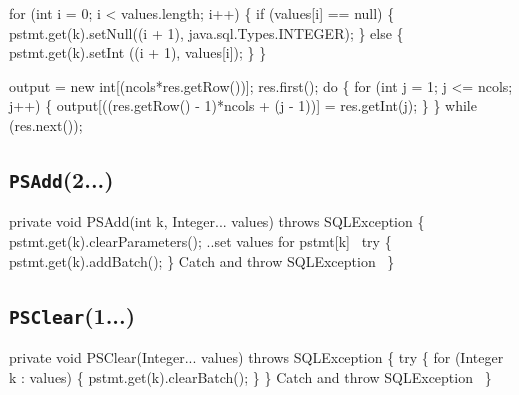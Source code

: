 \documentclass{article}
\def\nwendcode{\endtrivlist \endgroup}
\let\nwdocspar=\par
\theoremstyle{definition}
\begin{document}
for (int i = 0; i < values.length; i++) \{
  if (values[i] == null) \{
    pstmt.get(k).setNull((i + 1), java.sql.Types.INTEGER);
  \} else \{
    pstmt.get(k).setInt ((i + 1), values[i]);
  \}
\}
\nwendcode{}\nwdocspar
\nwenddocs{}\endmoddef{}
output = new int[(ncols*res.getRow())];
res.first();
do \{
  for (int j = 1; j <= ncols; j++) \{
    output[((res.getRow() - 1)*ncols + (j - 1))] = res.getInt(j);
  \}
\} while (res.next());
\nwendcode{}\nwdocspar
\subsection{{\tt{}\protect{}PSAdd}(2...)}
\nwenddocs{}\endmoddef{}
private void PSAdd(int k, Integer... values) throws SQLException \{
  pstmt.get(k).clearParameters();
  \LA{}..set values for \code{}pstmt[k]\edoc{}~{\nwtagstyle{}}\RA{}
  try \{
    pstmt.get(k).addBatch();
  \}
  \LA{}Catch and throw \code{}SQLException\edoc{}~{\nwtagstyle{}}\RA{}
\}
\eatline
{}\nwendcode{}\nwdocspar
\subsection{{\tt{}\protect{}PSClear}(1...)}
\nwenddocs{}\endmoddef{}
private void PSClear(Integer... values) throws SQLException \{
  try \{
    for (Integer k : values) \{
      pstmt.get(k).clearBatch();
    \}
  \}
  \LA{}Catch and throw \code{}SQLException\edoc{}~{\nwtagstyle{}}\RA{}
\}
\eatline
{}\nwendcode{}\nwdocspar
\end{document}
